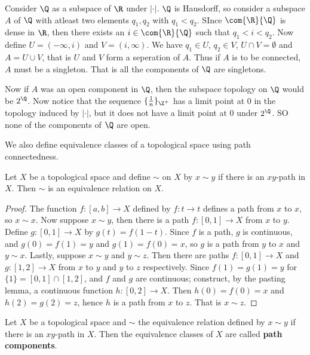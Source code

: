\begin{example}
    Consider $\Q$ as a subspace of  $\R$ under  $|\cdot|$.  $\Q$ is Hausdorff, so consider
    a subspace  $A$ of  $\Q$ with atleast two elements  $q_1,q_2$ with $ q_1<q_2$. SInce
    $\com{\R}{\Q}$ is dense in $\R$, then there exists an $i \in \com{\R}{\Q}$ such that $
    q_1<i<q_2$. Now define $U=(-\infty,i)$ and $V=(i,\infty)$. We have $ q_1 \in U$, $ q_2
    \in V$, $U \cap V=\emptyset$ and  $A=U \cup V$, that is  $U$ and  $V$ form a seperation
    of $A$. Thus if  $A$ is to be connected,  $A$ must be a singleton. That is all the
    components of  $\Q$ are singletons.

    Now if  $A$ was an open component in  $\Q$, then the subspace topology on  $\Q$ would be
    $2^{\Q}$. Now notice that the sequence $\{\frac{1}{n}\}_{\Z^+}$ has a limit point at $0$
    in the topology induced by  $|\cdot|$, but it does not have a limit point at  $0$ under
    $2^{\Q}$. SO none of the components of $\Q$ are open.
\end{example}

We also define equivalence classes of a topological space using path connectedness.

\begin{proposition}\label{3.3.4}
    Let $X$ be a topological space and define $\sim$ on $X$ by $x \sim y$ if  there is an $xy$-path
    in  $X$. Then  $\sim$ is an equivalence relation on $X$.
\end{proposition}
\begin{proof}
    The function $f:[a,b] \rightarrow X$ defined by $f:t \rightarrow t$ defines a path from $x$ to
    $x$, so  $x \sim x$. Now suppose  $x \sim y$, then there is a path  $f:[0,1] \rightarrow X$ from
    $x$ to  $y$. Define  $g:[0,1] \rightarrow X$ by $g(t)=f(1-t)$. Since $f$ is a path, $g$ is
    continuous, and $g(0)=f(1)=y$ and $g(1)=f(0)=x$, so $g$ is a path from  $y$ to  $x$ and  $y \sim
    x$. Lastly, suppose  $x \sim y$ and  $y \sim z$. Then there are paths  $f:[0,1] \rightarrow X$
    and $g:[1,2] \rightarrow X$ from $x$ to  $y$ and  $y$ to  $z$ respectively.  Since
    $f(1)=g(1)=y$ for $\{1\}=[0,1] \cap [1,2]$, and $f$ and  $g$ are continuous; construct, by the
    pasting lemma, a continuous function $h:[0,2] \rightarrow X$. Then $h(0)=f(0)=x$ and
    $h(2)=g(2)=z$, hence $h$ is a path from $x$ to  $z$. That is  $x \sim z$. 
\end{proof}

\begin{definition}
    Let $X$ be a topological space and  $\sim$ the equivalence relation defined by  $x \sim y$ if
    there is an  $xy$-path in  $X$. Then the equivalence classes of  $X$ are called \textbf{path
    components}.
\end{definition}

